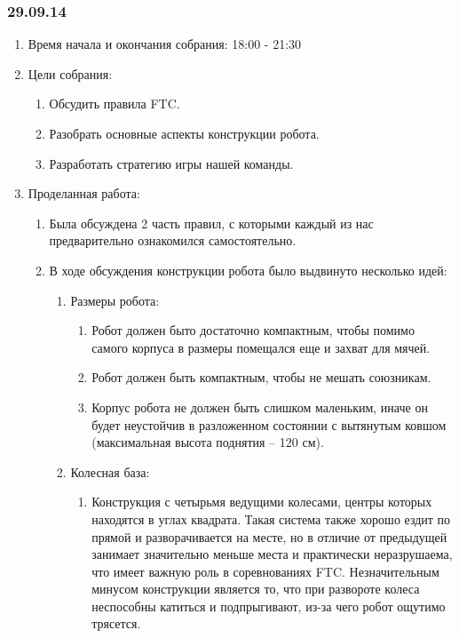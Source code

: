 	
\subsubsection{29.09.14}

\begin{enumerate}
	\item Время начала и окончания собрания:
	18:00 - 21:30
	\item Цели собрания:
	\begin{enumerate}
	  \item Обсудить правила FTC.
	  
	  \item Разобрать основные аспекты конструкции робота.
	  
      \item Разработать стратегию игры нашей команды.
    \end{enumerate}
	\item Проделанная работа:
	\begin{enumerate}
	  \item Была обсуждена 2 часть правил, с которыми каждый из нас предварительно ознакомился самостоятельно.
	  
	  \item В ходе обсуждения конструкции робота было выдвинуто несколько идей:
	  \begin{enumerate}
	    \item Размеры робота:
	    \begin{enumerate}
	      \item Робот должен быто достаточно компактным, чтобы помимо самого корпуса в размеры помещался еще и захват для мячей.
	      
	      \item Робот должен быть компактным, чтобы не мешать союзникам.
	      
	      \item Корпус робота не должен быть слишком маленьким, иначе он будет неустойчив в разложенном состоянии с вытянутым ковшом (максимальная высота поднятия – 120 см).
	      
	    \end{enumerate}
	    
	    \item Колесная база:
	    \begin{enumerate}
	      \item Конструкция с четырьмя ведущими колесами, центры которых находятся в углах квадрата. Такая система также хорошо ездит по прямой и разворачивается на месте, но в отличие от предыдущей занимает значительно меньше места и практически неразрушаема, что имеет важную роль в соревнованиях FTC. Незначительным минусом конструкции является то, что при развороте колеса неспособны катиться и подпрыгивают, из-за чего робот ощутимо трясется.	
	      

\end{enumerate}
\end{enumerate}
\end{enumerate}
\end{enumerate}
